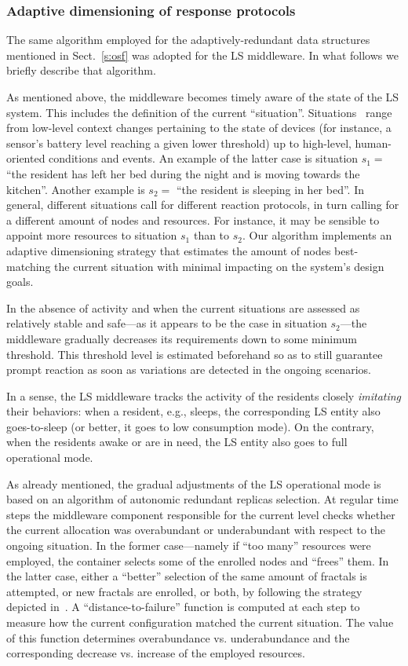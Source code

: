 \documentclass[twocolumn]{svjour3}
\begin{document}
\subsubsection{Adaptive dimensioning of response protocols}\label{sss:dtof}
The same algorithm employed for the adaptively-redundant 
data structures mentioned in Sect.~\ref{s:osf}
was adopted for the LS middleware. In what follows we briefly describe that algorithm.

As mentioned above, the middleware becomes timely aware of the state of the LS system.
This includes the definition of the current ``situation''.
Situations~\cite{YeDM12} range from low-level
context changes pertaining to the state of devices (for instance, a sensor's battery level reaching a
given lower threshold) up to high-level, human-oriented conditions and events.
An example of the latter case is
situation $s_1=$ ``the resident has left her bed during the night and is moving towards the kitchen''.
Another example is $s_2=$ ``the resident is sleeping in her bed''.
In general, different situations call for different reaction protocols, in turn calling for a different
amount of nodes and resources. For instance, it may be sensible to appoint more resources
to situation $s_1$ than to $s_2$.
Our algorithm implements
an adaptive dimensioning strategy that estimates the amount of
nodes best-matching the current situation with minimal impacting on the system's design goals.

In the absence of activity and when the current situations are assessed as relatively
stable and safe---as it appears to be the case in situation $s_2$---the
middleware gradually
decreases its requirements down to some minimum threshold. This threshold level is
estimated beforehand so as to still guarantee prompt reaction
as soon as variations are detected in the ongoing scenarios.

In a sense, the LS middleware
tracks the activity of the residents closely \emph{imitating\/}  their behaviors: when a resident,
e.g., sleeps, the
corresponding LS entity also goes-to-sleep (or better, it goes to low consumption mode).
On the contrary, when the residents awake or are in need, the
LS entity also goes to full operational mode.

As already mentioned,
the gradual adjustments of the LS operational mode is based on an algorithm of autonomic redundant replicas selection.
At regular time steps the middleware component responsible for the current level
checks whether the current allocation was overabundant or underabundant
with respect to the ongoing situation. In the former case---namely if ``too many'' resources were employed,
the container selects some of the enrolled nodes and ``frees'' them. In the latter case,
either a ``better'' selection
of the same amount of fractals is attempted, or new fractals are enrolled, or both, by
following the strategy depicted in~\cite{BDB11a,BDFB12}.
A ``distance-to-failure'' function
is computed at each step to measure how the current configuration matched the current situation. The value of this
function determines overabundance vs. underabundance and the corresponding decrease vs. increase of the employed resources.
\end{document}
